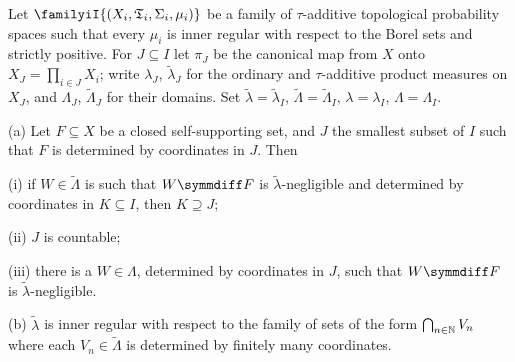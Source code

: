 
 Let
$\familyiI{(X_i,\frak T_i,\Sigma_i,\mu_i)}$
be a family of $\tau$-additive topological probability spaces such that
every $\mu_i$ is inner regular with respect to the Borel sets and
strictly positive.   For $J\subseteq I$ let $\pi_J$ be the canonical map
from $X$ onto $X_J=\prod_{i\in J}X_i$;  write $\lambda_J$,
$\tilde\lambda_J$
for the ordinary and $\tau$-additive product measures on $X_J$, and
$\Lambda_J$, $\tilde\Lambda_J$ for their domains.   Set
$\tilde\lambda=\tilde\lambda_I$, $\tilde\Lambda=\tilde\Lambda_I$,
$\lambda=\lambda_I$, $\Lambda=\Lambda_I$.

(a) Let $F\subseteq X$ be a closed self-supporting set, and $J$ the
smallest subset of $I$ such that $F$ is determined by coordinates
in $J$.   Then

\quad(i) if $W\in\tilde\Lambda$ is such that $W\symmdiff F$ is
$\tilde\lambda$-negligible and determined by coordinates in
$K\subseteq I$, then $K\supseteq J$;

\quad(ii) $J$ is countable;

\quad(iii) there is a $W\in\Lambda$, determined by coordinates in $J$,
such that $W\symmdiff F$ is $\tilde\lambda$-negligible.

(b) $\tilde\lambda$ is inner regular with respect to the family of sets
of the form $\bigcap_{n\in\Bbb N}V_n$ where each $V_n\in\tilde\Lambda$
is determined by finitely many coordinates.


